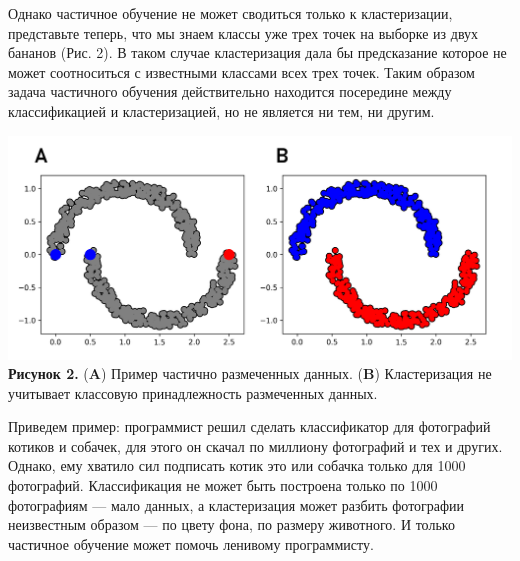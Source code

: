 Однако частичное обучение не может сводиться только к кластеризации, представьте теперь, что мы знаем классы уже трех точек на выборке из двух бананов (Рис. 2). В таком случае кластеризация дала бы предсказание которое не может соотноситься с известными классами всех трех точек. Таким образом задача частичного обучения действительно находится посередине между классификацией и кластеризацией, но не является ни тем, ни другим. \\
\begin{center}
\includegraphics[width=1.0\textwidth]{picture_2.png}
\textbf{Рисунок 2.} (\textbf{A}) Пример частично размеченных данных. (\textbf{B}) Кластеризация не учитывает классовую принадлежность размеченных данных. 
\end{center}

Приведем пример: программист решил сделать классификатор для фотографий котиков и собачек, для этого он скачал по миллиону фотографий и тех и других. Однако, ему хватило сил подписать котик это или собачка только для 1000 фотографий. Классификация не может быть построена только по 1000 фотографиям --- мало данных, а кластеризация может разбить фотографии неизвестным образом --- по цвету фона, по размеру животного. И только частичное обучение может помочь ленивому программисту.
